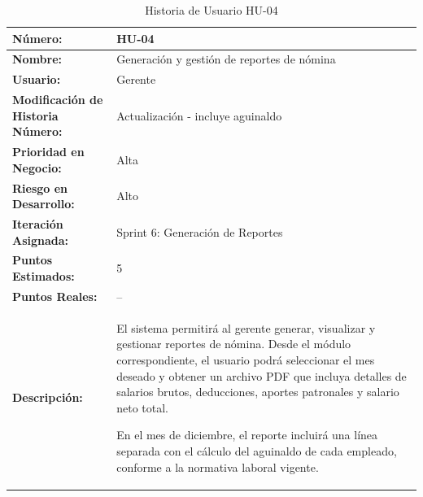 \begin{table}[h]
	\centering
	\caption{Historia de Usuario HU-04}
	\begin{tabular}{|p{5cm}|p{10cm}|}
		\hline
		\textbf{Número:}                          & HU-04                                      \\ \hline
		\textbf{Nombre:}                          & Generación y gestión de reportes de nómina \\ \hline
		\textbf{Usuario:}                         & Gerente                                    \\ \hline
		\textbf{Modificación de Historia Número:} & Actualización - incluye aguinaldo          \\ \hline
		\textbf{Prioridad en Negocio:}            & Alta                                       \\ \hline
		\textbf{Riesgo en Desarrollo:}            & Alto                                       \\ \hline
		\textbf{Iteración Asignada:}              & Sprint 6: Generación de Reportes           \\ \hline
		\textbf{Puntos Estimados:}                & 5                                          \\ \hline
		\textbf{Puntos Reales:}                   & --                                         \\ \hline
		\textbf{Descripción:}                     &
		El sistema permitirá al gerente generar, visualizar y gestionar reportes de nómina. Desde el módulo correspondiente, el usuario podrá seleccionar el mes deseado y obtener un archivo PDF que incluya detalles de salarios brutos, deducciones, aportes patronales y salario neto total.

		En el mes de diciembre, el reporte incluirá una línea separada con el cálculo del aguinaldo de cada empleado, conforme a la normativa laboral vigente.


\end{tabular}
\end{table}
